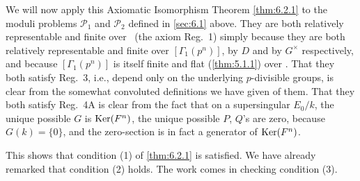 \begin{pitem}\label{km:6.3.1}
We will now apply this Axiomatic Isomorphism Theorem \ref{thm:6.2.1} to the moduli problems $\mathcal{P}_1$ and $\mathcal{P}_2$ defined in \ref{sec:6.1} above. They are both relatively representable and finite over \Ell\ (the axiom Reg.~1) simply because they are both relatively representable and finite over $[\Gamma_1(p^n)]$, by $D$ and by $G^\times$ respectively, and because $[\Gamma_1(p^n)]$ is itself finite and flat (\ref{thm:5.1.1}) over \Ell. That they both satisfy Reg.~3, i.e., depend only on the underlying $p$-divisible groups, is clear from the somewhat convoluted definitions we have given of them. That they both satisfy Reg.~4A is clear from the fact that on a supersingular $E_0/k$, the unique possible $G$ is $\operatorname{Ker}(F^n)$, the unique possible $P$, $Q$'s are zero, because $G(k) = \{0\}$, and the zero-section is in fact a generator of $\operatorname{Ker}(F^n)$.

This shows that condition (1) of \ref{thm:6.2.1} is satisfied. We have already remarked that condition (2) holds. The work comes in checking condition (3).
\end{pitem}

